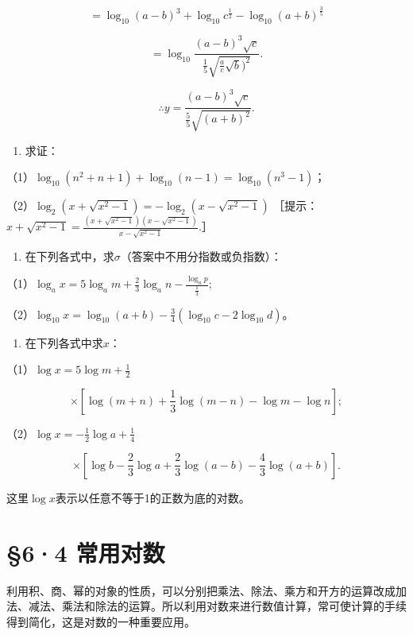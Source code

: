 \[
= \log_{10} (a - b)^{3} + \log_{10} c^{\frac{1}{2}} - \log_{10} (a + b)^{\frac{3}{5}}
\]

\[
= \log_{10} \frac{(a - b)^{3} \sqrt{c}}{\frac{1}{5} \sqrt{\frac{a}{c} \sqrt{b})^{2}}}.
\]

\[
\therefore y = \frac{(a - b)^{3} \sqrt{c}}{\frac{5}{5} \sqrt{(a + b)^{2}}}.
\]

\begin{enumerate}
\item
  求证：
\end{enumerate}

（1）\(\log_{10}(n^2 + n + 1) + \log_{10}(n - 1) = \log_{10}(n^3 - 1)\)；

（2）\(\log_2(x + \sqrt{x^2 - 1}) = -\log_2(x - \sqrt{x^2 - 1})\)
［提示：\(x + \sqrt{x^2 - 1} = \frac{(x + \sqrt{x^2 - 1})(x - \sqrt{x^2 - 1})}{x - \sqrt{x^2 - 1}}.\)］

\begin{enumerate}[start=2]
\item
  在下列各式中，求\(\sigma\)（答案中不用分指数或负指数）：
\end{enumerate}

（1）\(\log_a x = 5\log_a m + \frac{2}{3}\log_a n - \frac{\log_a p}{\frac{1}{3}};\)

（2）\(\log_{10} x = \log_{10}(a + b) - \frac{3}{4} (\log_{10} c - 2 \log_{10} d)\)。

\begin{enumerate}[start=3]
\item
  在下列各式中求\(x\)：
\end{enumerate}

（1）\(\log x = 5\log m + \frac{1}{2}\)

\[
\times \left[ \log (m + n) + \frac{1}{3} \log (m - n) - \log m - \log n \right];
\]

（2）\(\log x = -\frac{1}{2} \log a + \frac{1}{4}\)

\[
\times \left[ \log b - \frac{2}{3} \log a + \frac{2}{3} \log (a - b) - \frac{4}{3} \log (a + b) \right].
\]

这里\(\log x\)表示以任意不等于1的正数为底的对数。

\section{§6·4 常用对数}

利用积、商、幂的对象的性质，可以分别把乘法、除法、乘方和开方的运算改成加法、减法、乘法和除法的运算。所以利用对数来进行数值计算，常可使计算的手续得到简化，这是对数的一种重要应用。


